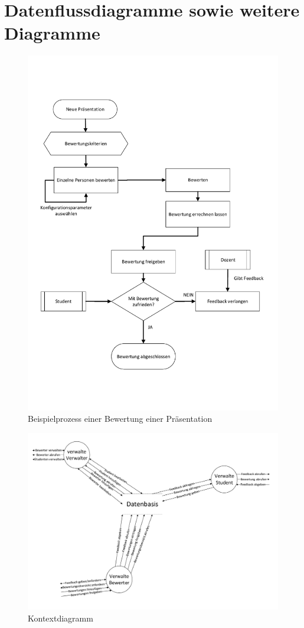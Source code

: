 	\section{Datenflussdiagramme sowie weitere Diagramme}

	\begin{figure}[H]
		\centering
		\includegraphics[height=0.9\textheight]{../Diagramme/Beispiel-FlussdiagrPraesi.pdf}
		\caption{Beispielprozess einer Bewertung einer Präsentation}
	\end{figure}
	\begin{figure}[H]
		\centering
		\includegraphics[width=1.4\textwidth, angle=90, origin=c]{../Diagramme/Kontextdiagramm_DFD0.pdf}
		\caption{Kontextdiagramm}
	\end{figure}
